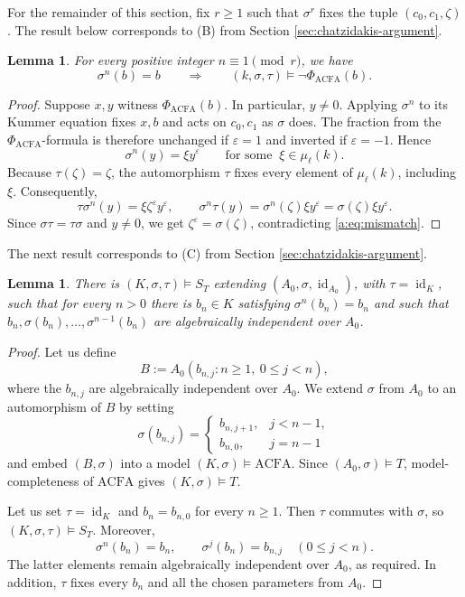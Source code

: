 \documentclass[10pt,a4paper]{amsart}
\renewcommand{\geq}{\geqslant}
\renewcommand{\leq}{\leqslant}
\renewcommand{\ge}{\geqslant}
\newtheorem{lemma}[theorem]{Lemma}
\theoremstyle{definition}
\DeclareMathOperator{\id}{id}
\newcommand{\ACFA}{\mathrm{ACFA}}
\begin{document}
For the remainder of this section, fix $r\ge1$ such that
$\sigma^r$ fixes the tuple $(c_0,c_1,\zeta)$. The result below corresponds to (B) from Section \ref{sec:chatzidakis-argument}.
\begin{lemma}\label{a:lem:obstruction}
For every positive integer $n\equiv1\pmod r$, we have
\[
\sigma^n(b)=b
\qquad\Longrightarrow\qquad
(k,\sigma,\tau)\models\neg\Phi_{\mathrm{ACFA}}(b).
\]
\end{lemma}

\begin{proof}
Suppose $x,y$ witness $\Phi_{\mathrm{ACFA}}(b)$. In particular, $y\neq0$. Applying $\sigma^n$ to its Kummer equation fixes $x,b$ and acts on $c_0,c_1$ as $\sigma$ does. The fraction from the $\Phi_{\mathrm{ACFA}}$-formula is therefore unchanged if $\varepsilon=1$ and inverted if $\varepsilon=-1$. Hence
\[
 \sigma^n(y)=\xi y^\varepsilon\qquad\text{for some }\ \xi\in\mu_\ell(k).
\]
Because $\tau(\zeta)=\zeta$, the automorphism $\tau$ fixes every element of $\mu_\ell(k)$, including $\xi$. Consequently,
\[
 \tau\sigma^n(y)=\xi\zeta^\varepsilon y^\varepsilon,\qquad
 \sigma^n\tau(y)=\sigma^n(\zeta)\xi y^\varepsilon
                 =\sigma(\zeta)\xi y^\varepsilon.
\]
Since $\sigma\tau=\tau\sigma$ and $y\neq0$, we get $\zeta^\varepsilon=\sigma(\zeta)$, contradicting \eqref{a:eq:mismatch}.
\end{proof}
The next result corresponds to (C) from Section \ref{sec:chatzidakis-argument}.
\begin{lemma}\label{a:lem:obstruction_exists}
There is $(K,\sigma,\tau)\models S_T$ extending
$(A_0,\sigma,\id_{A_0})$, with $\tau=\id_K$, such that
for every $n>0$ there is $b_n\in K$ satisfying
$\sigma^n(b_n)=b_n$ and such that
$b_n,\sigma(b_n),\ldots,\sigma^{n-1}(b_n)$
are algebraically independent over $A_0$.
\end{lemma}

\begin{proof}
Let us define
\[
B:=A_0(b_{n,j}:n\geq1,\ 0\leq j<n),
\]
where the $b_{n,j}$ are algebraically independent over $A_0$.  
We extend $\sigma$ from $A_0$ to an automorphism of $B$ by setting
\[
\sigma(b_{n,j})=
\begin{cases}
b_{n,j+1},&j<n-1,\\
b_{n,0},&j=n-1
\end{cases}
\]
and embed $(B,\sigma)$ into a model $(K,\sigma)\models\ACFA$.
Since $(A_0,\sigma)\models T$, model-completeness of $\ACFA$
gives $(K,\sigma)\models T$.

Let us set $\tau=\id_K$ and $b_n=b_{n,0}$ for every $n\geq1$.
Then $\tau$ commutes with $\sigma$, so
$(K,\sigma,\tau)\models S_T$.
Moreover,
\[
\sigma^n(b_n)=b_n,
\qquad
\sigma^j(b_n)=b_{n,j}\quad(0\leq j<n).
\]
The latter elements remain algebraically independent over $A_0$,
as required. In addition, $\tau$ fixes every $b_n$ and all the chosen parameters
from $A_0$.
\end{proof}
\end{document}
